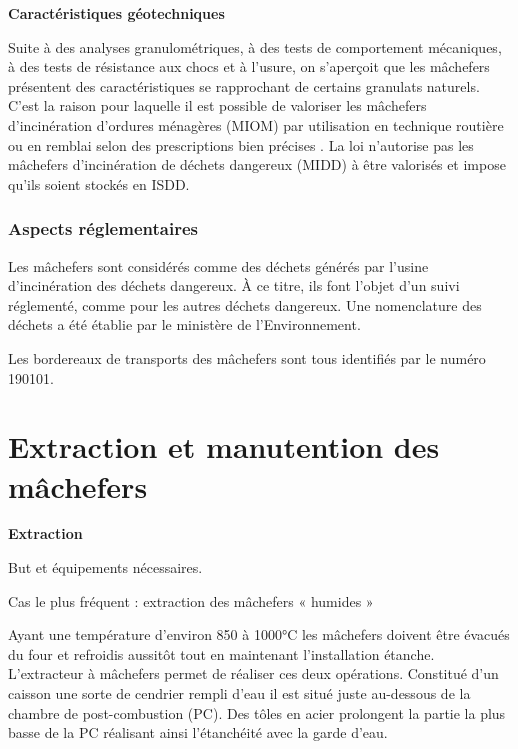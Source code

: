 \vspace{0.3cm}
\textbf{Caractéristiques géotechniques}
\vspace{0.3cm}

Suite à des analyses granulométriques, à des tests de comportement mécaniques, à des tests de résistance aux chocs et à l’usure, on s’aperçoit que les mâchefers présentent des caractéristiques se rapprochant de certains granulats naturels. C’est la raison pour laquelle il est possible de valoriser les mâchefers d’incinération d’ordures ménagères (MIOM) par utilisation en technique routière ou en remblai selon des prescriptions bien précises . La loi n’autorise pas les mâchefers d’incinération de déchets dangereux (MIDD) à être valorisés et impose qu’ils soient stockés en ISDD. 

\subsubsection{Aspects réglementaires}

Les mâchefers sont considérés comme des déchets générés par l’usine d’incinération des déchets dangereux. À ce titre, ils font l’objet d’un suivi réglementé, comme pour les autres déchets dangereux. Une nomenclature des déchets a été établie par le ministère de l’Environnement. 
\vspace{0.3cm}

Les bordereaux de transports des mâchefers sont tous identifiés par le numéro 190101.


\section{Extraction et manutention des mâchefers}

\vspace{0.3cm}
\textbf{Extraction}
\vspace{0.3cm}

\vspace{0.3cm}

But et équipements nécessaires. 
\vspace{0.3cm}

Cas le plus fréquent : extraction des mâchefers « humides »
\vspace{0.3cm}

Ayant une température d’environ 850 à 1000°C les mâchefers doivent être évacués du four et refroidis aussitôt tout en maintenant l’installation étanche. L’extracteur à mâchefers permet de réaliser ces deux opérations. Constitué d’un caisson une sorte de cendrier rempli d’eau il est situé juste au-dessous de la chambre de post-combustion (PC). Des tôles en acier prolongent la partie la plus basse de la PC réalisant ainsi l’étanchéité avec la garde d’eau.
\vspace{0.3cm}

